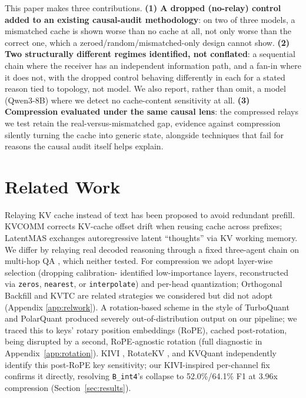 \documentclass[11pt]{article}
\begin{document}
This paper makes three contributions. \textbf{(1) A dropped (no-relay)
control added to an existing causal-audit methodology}: on two of three
models, a mismatched cache is shown worse than no cache at all, not
only worse than the correct one, which a zeroed/random/mismatched-only
design cannot show. \textbf{(2) Two structurally different regimes
identified, not conflated}: a sequential chain where the receiver has
an independent information path, and a fan-in where it does not, with
the dropped control behaving differently in each for a stated reason
tied to topology, not model. We also report, rather than omit, a model
(Qwen3-8B) where we detect no cache-content sensitivity at all.
\textbf{(3) Compression evaluated under the same causal lens}: the
compressed relays we test retain the real-versus-mismatched gap,
evidence against compression silently turning the cache into generic
state, alongside techniques that fail for reasons the causal audit
itself helps explain.

\section{Related Work}
\label{sec:related}

Relaying KV cache instead of text has been proposed to avoid redundant
prefill. KVCOMM \citep{kvcomm2025} corrects KV-cache offset drift when
reusing cache across prefixes; LatentMAS \citep{latentmas2026} exchanges
autoregressive latent ``thoughts'' via KV working memory. We differ by
relaying real decoded reasoning through a fixed three-agent chain on
multi-hop QA \citep{hotpotqa2018}, which neither tested. For
compression we adopt layer-wise selection (dropping calibration-
identified low-importance layers, reconstructed via \texttt{zeros},
\texttt{nearest}, or \texttt{interpolate}) and per-head quantization;
Orthogonal Backfill \citep{orthobackfill2026} and KVTC \citep{kvtc2026}
are related strategies we considered but did not adopt (Appendix
\ref{app:relwork}). A rotation-based scheme in the style of TurboQuant
\citep{turboquant2026} and PolarQuant \citep{polarquant2026} produced
severely out-of-distribution output on our pipeline; we traced this to
keys' rotary position embeddings (RoPE), cached post-rotation, being
disrupted by a second, RoPE-agnostic rotation (full diagnostic in
Appendix~\ref{app:rotation}). KIVI \citep{kivi2024}, RotateKV
\citep{rotatekv2025}, and KVQuant \citep{kvquant2024} independently
identify this post-RoPE key sensitivity; our KIVI-inspired per-channel
fix confirms it directly, resolving \texttt{B\_int4}'s collapse to
52.0\%/64.1\% F1 at 3.96x compression (Section~\ref{sec:results}).
\end{document}
